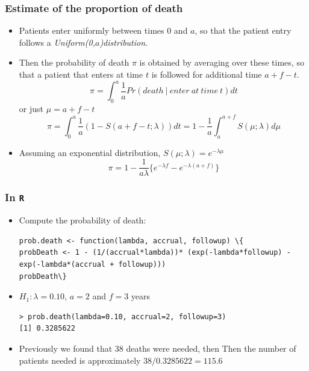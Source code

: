 \documentclass{beamer}
\newcommand{\empr}[1]{{\emph{\color{red}#1}}}
\begin{document}
\pagebreak
\begin{frame}
\frametitle{Estimate of the proportion of death}
\begin{itemize}
\item Patients enter uniformly between times 0 and $a$, so that the patient entry follows a \empr{Uniform(0,$a$)distribution}.
\item Then the probability of death $\pi$ is obtained by averaging over these times, so that a patient that enters at time $t$ is followed for additional time $a+f-t$.
\begin{equation}
\pi = \int_{0}^{a}\frac{1}{a}Pr(death\ |\ enter\ at\ time\ t)dt
\end{equation}
or just $\mu = a+f-t $
\begin{equation}
\pi = \int_{0}^{a}\frac{1}{a}(1-S(a+f-t;\lambda))dt = 1- \frac{1}{a}\int_{a}^{a+f}S(\mu;\lambda)d\mu
\end{equation}
\item Assuming an exponential distribution, $S(\mu;\lambda) = e^{-\lambda \mu}$
\begin{equation}
\pi = 1-\frac{1}{a\lambda}\lbrace e^{-\lambda f} - e^{-\lambda(a+f)}\rbrace
\end{equation}
\end{itemize}
\end{frame}

\pagebreak
\begin{frame}[fragile]
\frametitle{In \texttt{R}}
\begin{itemize}
\item Compute the probability of death:
\begin{Verbatim}
prob.death <- function(lambda, accrual, followup) \{ 
probDeath <- 1 - (1/(accrual*lambda))* (exp(-lambda*followup) - 
exp(-lambda*(accrual + followup))) 
probDeath\}
\end{Verbatim}
\item $H_1: \lambda = 0.10$, $a = 2$ and $f=3$ years 
\begin{Verbatim}
> prob.death(lambda=0.10, accrual=2, followup=3)
[1] 0.3285622
\end{Verbatim}
\item Previously we found that 38 deaths were needed, then Then the number of patients needed is approximately $38/0.3285622=115.6$
\end{itemize}
\end{frame}
\end{document}
